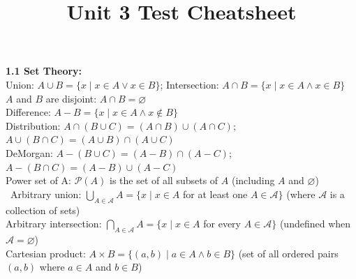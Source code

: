 \documentclass{article}
\title{Unit 3 Test Cheatsheet}
\date{}
\begin{document}
\maketitle
\textbf{1.1 Set Theory:}\\
Union: $A \cup B = \{x \mid x \in A \lor x \in B\}$; Intersection: $A \cap B = \{x \mid x \in A \land x \in B\}$\\
$A$ and $B$ are disjoint: $A \cap B = \varnothing$\\
Difference: $A - B = \{x \mid x \in A \land x \notin B\}$\\
Distribution: $A \cap (B \cup C) = (A \cap B) \cup (A \cap C)$; $A \cup (B \cap C) = (A \cup B) \cap (A \cup C)$\\
DeMorgan: $A - (B \cup C) = (A - B) \cap (A - C)$; $A - (B \cap C) = (A - B) \cup (A - C)$\\
Power set of A: $\mathcal{P}(A)$ is the set of all subsets of $A$ (including $A$ and $\varnothing$)\\\
Arbitrary union: $\bigcup_{A \in \mathcal{A}} A = \{x \mid x \in A$ for at least one $A \in \mathcal{A}\}$ (where $\mathcal{A}$ is a collection of sets)\\
Arbitrary intersection: $\bigcap_{A \in \mathcal{A}} A = \{x \mid x \in A$ for every $A \in \mathcal{A}\}$ (undefined when $\mathcal{A} = \varnothing$)\\
Cartesian product: $A \times B = \{(a, b) \mid a \in A \land b \in B\}$ (set of all ordered pairs $(a, b)$ where $a \in A$ and $b \in B$)\\
\end{document}
